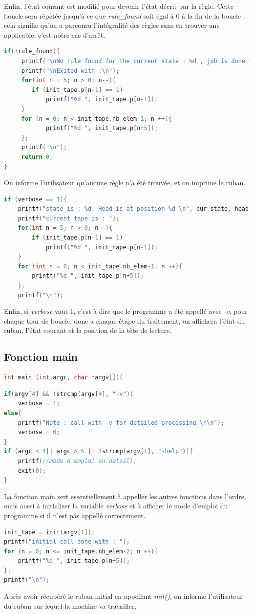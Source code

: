 \documentclass[12pt,a4paper]{report}
\begin{document}
Enfin, l'état courant est modifié pour devenir l'état décrit par la règle. Cette boucle sera répétée jusqu'à ce que \textit{rule\_found} soit égal à 0 à la fin de la boucle : cela signifie qu'on a parcouru l'intégralité des règles sans en trouver une applicable, c'est notre cas d'arrêt.
\begin{lstlisting}[language=c]
if(!rule_found){
	 printf("\nNo rule found for the current state : %d , job is done.", cur_state);
	 printf("\nExited with :\n");
	 for(int n = 5; n > 0; n--){
	 	if (init_tape.p[n-1] == 1)
	 		printf("%d ", init_tape.p[n-1]);
	 }
	 for (n = 0; n < init_tape.nb_elem-1; n ++){
			printf("%d ", init_tape.p[n+5]);
	 };
	 printf("\n");
	 return 0;
}
\end{lstlisting}
On informe l'utilisateur qu'aucune règle n'a été trouvée, et on imprime le ruban.\\
\begin{lstlisting}[language=c]
if (verbose == 1){
	printf("state is : %d. Head is at position %d \n", cur_state, head_pos);
	printf("current tape is : ");
	for(int n = 5; n > 0; n--){
		if (init_tape.p[n-1] == 1)
			printf("%d ", init_tape.p[n-1]);
	}
	for (int n = 0; n < init_tape.nb_elem-1; n ++){
		printf("%d ", init_tape.p[n+5]);
	};
	printf("\n");
\end{lstlisting}
Enfin, si \textit{verbose} vaut 1, c'est à dire que le programme a été appellé avec \textit{-v}, pour chaque tour de boucle, donc a chaque étape du traitement, on affichera l'état du ruban, l'état courant et la position de la tête de lecture.
\subsection{Fonction main}
\begin{lstlisting}[language=c]
int main (int argc, char *argv[]){
\end{lstlisting}
\begin{lstlisting}[language=c]
if(argv[4] && !strcmp(argv[4], "-v"))
	verbose = 1;
else{
	printf("Note : call with -v for detailed processing.\n\n");
	verbose = 0;
}
if (argc < 4|| argc > 5 || !strcmp(argv[1], "-help")){
	printf(//mode d'emploi en detail);
	exit(0);
}
\end{lstlisting}
La fonction main sert essentiellement à appeller les autres fonctions dans l'ordre, mais aussi à initialiser la variable \textit{verbose} et à afficher le mode d'emploi du programme si il n'est pas appellé correctement.
\begin{lstlisting}[language=c]
init_tape = init(argv[1]);
printf("initial call done with : ");
for (n = 0; n <= init_tape.nb_elem-2; n ++){
	printf("%d ", init_tape.p[n+5]);
};
printf("\n");
\end{lstlisting}
Après avoir récupèré le ruban initial en appellant \textit{init()}, on informe l'utilisateur du ruban sur lequel la machine va travailler.
\end{document}
